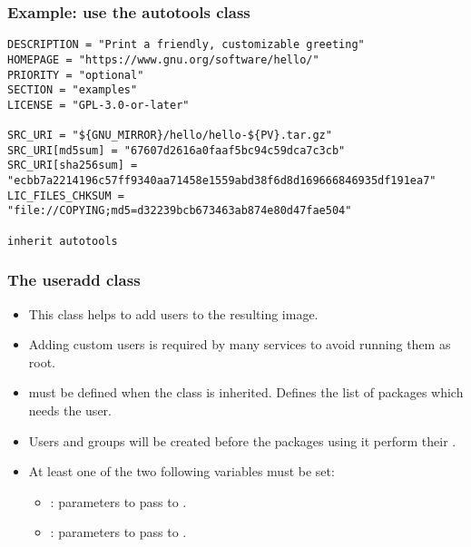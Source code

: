 \begin{frame}[fragile]
  \frametitle{Example: use the autotools class}
  \begin{block}{}
    \begin{verbatim}
DESCRIPTION = "Print a friendly, customizable greeting"
HOMEPAGE = "https://www.gnu.org/software/hello/"
PRIORITY = "optional"
SECTION = "examples"
LICENSE = "GPL-3.0-or-later"

SRC_URI = "${GNU_MIRROR}/hello/hello-${PV}.tar.gz"
SRC_URI[md5sum] = "67607d2616a0faaf5bc94c59dca7c3cb"
SRC_URI[sha256sum] = "ecbb7a2214196c57ff9340aa71458e1559abd38f6d8d169666846935df191ea7"
LIC_FILES_CHKSUM = "file://COPYING;md5=d32239bcb673463ab874e80d47fae504"

inherit autotools
    \end{verbatim}
  \end{block}
\end{frame}

\begin{frame}
  \frametitle{The useradd class}
  \begin{itemize}
    \item This class helps to add users to the resulting image.
    \item Adding custom users is required by many services to avoid
          running them as root.
    \item {} must be defined when the
           class is inherited. Defines the list of
          packages which needs the user.
    \item Users and groups will be created before the packages using
          it perform their .
    \item At least one of the two following variables must be set:
    \begin{itemize}
      \item {}: parameters to pass to
            .
      \item {}: parameters to pass to
            .
    \end{itemize}
  \end{itemize}
\end{frame}

